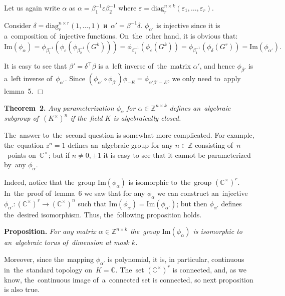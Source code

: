 \documentclass[twoside]{article}
\begin{document}
    Let us again write $\alpha$ as $\alpha = \beta_1^{-1} \varepsilon \beta_2^{-1}$ where
    $
        \varepsilon = \mathrm{diag}^{n \times k}_r(\varepsilon_1, \ldots, \varepsilon_r).
    $

    Consider $\delta = \mathrm{diag}^{n \times r}_r(1, \ldots, 1)$ и~$\alpha' = \beta^{-1} \delta$.
    $\phi_{\alpha'}$ is injective since it is a~composition of~injective functions. On~the~other hand, it is obvious that:
    $$
        \mathrm{Im}(\phi_\alpha) = \phi_{\beta_1^{-1}} (\phi_\varepsilon (\phi_{\beta_2^{-1}} (G^k)))
                                 = \phi_{\beta_1^{-1}} (\phi_\varepsilon (G^k))
                                 = \phi_{\beta_1^{-1}} (\phi_{\delta} (G^r))
                                 = \mathrm{Im}(\phi_{\alpha'}).
    $$

    It is easy to see that $\beta' = \delta^{\top} \beta$ is a~left inverse of~the~matrix $\alpha'$,
    and hence $\phi_{\beta'}$ is a~left inverse of~$\phi_{\alpha'}$. Since $(\phi_{\alpha'} \circ \phi_{\beta'}) \phi_{-E} = \phi_{\alpha' \beta' - E}$,
    we only need to~apply lemma~5.
\hfill$\Box$\medskip

\medskip\noindent\textbf{Theorem~2.}\emph{
    Any parameterization $\phi_\alpha$ for $\alpha \in \mathbb{Z}^{n \times k}$ defines an~algebraic subgroup
    of~$(K^\times)^n$ if the~field $K$ is algebraically closed.
}\medskip

The~answer to~the~second question is somewhat more complicated. For example, the~equation $z^n = 1$ defines an~algebraic
group for any $n \in \mathbb{Z}$ consisting of~$n$~points on~$\mathbb{C}^\times$; but if $n \neq 0, \pm 1$
it is easy to see that it cannot be parameterized by~any $\phi_\alpha$.

Indeed, notice that the~group $\mathrm{Im}(\phi_\alpha)$ is isomorphic to~the~group $(\mathbb{C}^\times)^r$.
In~the~proof of~lemma~6 we saw that for any $\phi_\alpha$ we can construct an~injective $\phi_{\alpha'} : (\mathbb{C}^\times)^r \rightarrow (\mathbb{C}^\times)^n$
such that $\mathrm{Im}(\phi_\alpha) = \mathrm{Im}(\phi_{\alpha'})$; but then $\phi_{\alpha'}$ defines the~desired isomorphism.
Thus, the~following proposition holds.

\medskip\noindent\textbf{Proposition.}\emph{
    For any matrix $\alpha \in \mathbb{Z}^{n \times k}$ the~group $\mathrm{Im}(\phi_\alpha)$ is isomorphic to an~algebraic torus
    of~dimension at mosk $k$.
}\medskip

Moreover, since the~mapping $\phi_{\alpha'}$ is polynomial, it is, in particular, continuous in~the~standard topology
on~$K = \mathbb{C}$. The~set $(\mathbb{C}^\times)^r$ is connected, and, as we know, the~continuous image
of~a~connected set is connected, so next proposition is also true.
\end{document}
